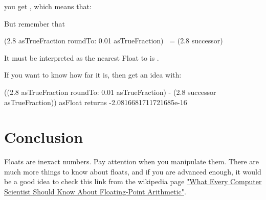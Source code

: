 \documentclass[a4paper,10pt,twoside]{book}
\begin{document}
you get , which means that:

But remember that 

\begin{code}{}
(2.8 asTrueFraction roundTo: 0.01 asTrueFraction) ~= (2.8 successor)
\end{code}

It must be interpreted as the nearest Float to  is .

If you want to know how far it is, then get an idea with:

\begin{code}{}
((2.8 asTrueFraction roundTo: 0.01 asTrueFraction) - (2.8 successor asTrueFraction)) asFloat
	returns -2.0816681711721685e-16
\end{code}



\section{Conclusion}
Floats are inexact numbers. Pay attention when you manipulate them.
There are much more things to know about floats, and if you are advanced enough, it would be a good idea to check this link from the wikipedia page \href{http://www.validlab.com/goldberg/paper.pdf}{"What Every Computer Scientist Should Know About Floating-Point Arithmetic"}.


\ifx\wholebook\relax\else
   
   
\end{document}
